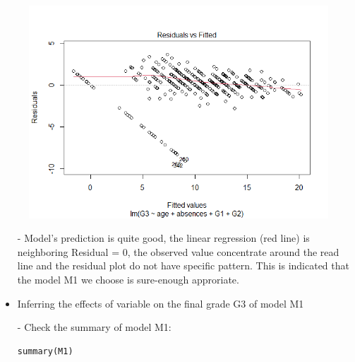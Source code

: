 \documentclass[a4paper]{article}
\numberwithin{equation}{section}
\begin{document}
\begin{figure}[H]
  \includegraphics[scale = 0.7]{residual_plot.png}
\end{figure}


\begin{itemize}
  \item[-] Model's prediction is quite good, the linear regression (red line) is neighboring Residual = 0, the observed value concentrate around the read line and the residual plot do not have specific pattern. This is indicated that the model M1 we choose is sure-enough approriate.
\end{itemize}


\begin{itemize}
  \item Inferring the effects of variable on the final grade G3 of model M1
  \item[-] Check the summary of model M1:

        \begin{mdframed}[leftline=false,rightline=false,backgroundcolor=magenta!10,nobreak=true]
          \begin{verbatim}
summary(M1)
          \end{verbatim}
        \end{mdframed}
\end{itemize}
\end{document}
